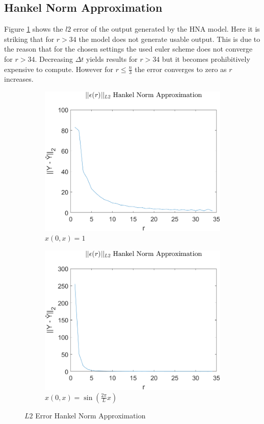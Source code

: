 \subsection{Hankel Norm Approximation}
Figure \ref{FIG-ERR-HNA} shows the \(l2\) error of the output generated by the HNA model.
Here it is striking that for \(r > 34\) the model does not generate usable output.
This is due to the reason that for the chosen settings the used euler scheme does not converge for \(r > 34\).
Decreasing \(\Delta t\) yields results for \(r > 34\) but it becomes prohibitively expensive to compute.
However for \(r \leq \frac{n}{3}\) the error converges to zero as \(r\) increases.

\begin{figure}[H]
\begin{subfigure}[b]{0.5\textwidth}
\centering
\includegraphics[width=\textwidth]{images/L2_HNA}
\caption{$x(0, x) = 1$}
\label{FIG-ERR-HNA}
\end{subfigure}
\begin{subfigure}[b]{0.5\textwidth}
\centering
\includegraphics[width=\textwidth]{images/L2_HNA_SIN}
\caption{$x(0, x) = \sin(\frac{2\pi}{L}x)$}
\label{FIG-ERR-HNA-SIN}
\end{subfigure}
\caption{\(L2\) Error Hankel Norm Approximation}
\end{figure}
